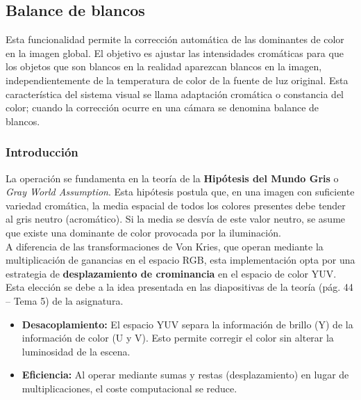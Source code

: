 \documentclass[11pt]{article}
\begin{document}
  \subsection{Balance de blancos}
      \label{subsec:balance-blancos}
      Esta funcionalidad permite la corrección automática de las dominantes de color
      en la imagen global. El objetivo es ajustar las intensidades cromáticas para
      que los objetos que son blancos en la realidad aparezcan blancos en la imagen,
      independientemente de la temperatura de color de la fuente de luz original.
      Esta característica del sistema visual se llama adaptación cromática o
      constancia del color; cuando la corrección ocurre en una cámara se denomina
      balance de blancos. \cite{enwiki:1296451820} \\

      \subsubsection{Introducción}

          La operación se fundamenta en la teoría de la \textbf{Hipótesis del Mundo Gris}
          o \textit{Gray World Assumption}. Esta hipótesis postula que, en una imagen con
          suficiente variedad cromática, la media espacial de todos los colores presentes
          debe tender al gris neutro (acromático). Si la media se desvía de este valor
          neutro, se asume que existe una dominante de color provocada por la
          iluminación. \\

          A diferencia de las transformaciones de Von Kries, que operan mediante la
          multiplicación de ganancias en el espacio RGB, esta implementación opta por una
          estrategia de \textbf{desplazamiento de crominancia} en el espacio de color
          YUV. Esta elección se debe a la idea presentada en las diapositivas de la
          teoría (pág. 44 -- Tema 5) de la asignatura.

          \begin{itemize}
              \item \textbf{Desacoplamiento:} El espacio YUV separa la información de brillo (Y) de la información de color (U y V). Esto permite corregir el color sin alterar la luminosidad de la escena.

              \item \textbf{Eficiencia:} Al operar mediante sumas y restas (desplazamiento) en lugar de multiplicaciones, el coste computacional se reduce.
          \end{itemize}
\end{document}
